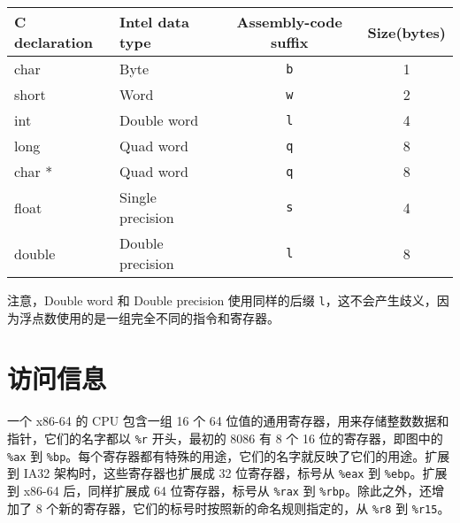 \begin{table}[!ht]
    \centering
    \begin{tabular}{llcc}
        \toprule
        C declaration & Intel data type & Assembly-code suffix & Size(bytes) \\
        \midrule
        char    & Byte              & \verb|b|  & 1 \\
        short   & Word              & \verb|w|  & 2 \\
        int     & Double word       & \verb|l|  & 4 \\
        long    & Quad word         & \verb|q|  & 8 \\
        char *  & Quad word         & \verb|q|  & 8 \\
        float   & Single precision  & \verb|s|  & 4 \\
        double  & Double precision  & \verb|l|  & 8 \\
        \bottomrule
    \end{tabular}
\end{table}

注意，Double word 和 Double precision 使用同样的后缀 \verb|l|，这不会产生歧义，因为浮点数使用的是一组完全不同的指令和寄存器。

\section{访问信息}

一个 x86-64 的 CPU 包含一组 16 个 64 位值的通用寄存器，用来存储整数数据和指针，它们的名字都以 \verb|%r| 开头，最初的 8086 有 8 个 16 位的寄存器，即图中的 \verb|%ax| 到 \verb|%bp|。每个寄存器都有特殊的用途，它们的名字就反映了它们的用途。扩展到 IA32 架构时，这些寄存器也扩展成 32 位寄存器，标号从 \verb|%eax| 到 \verb|%ebp|。扩展到 x86-64 后，同样扩展成 64 位寄存器，标号从 \verb|%rax| 到 \verb|%rbp|。除此之外，还增加了 8 个新的寄存器，它们的标号时按照新的命名规则指定的，从 \verb|%r8| 到 \verb|%r15|。

